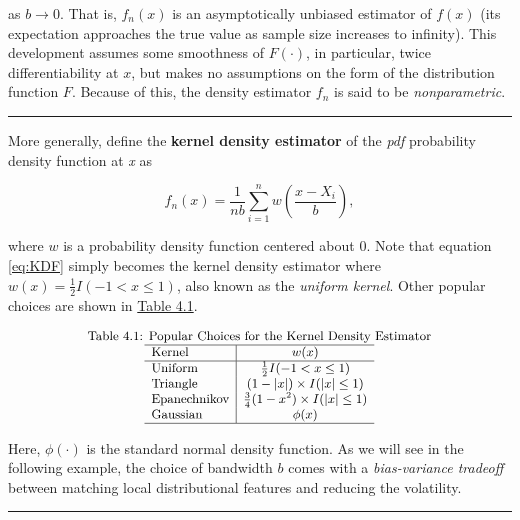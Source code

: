 \documentclass[]{book}
\theoremstyle{definition}
\theoremstyle{definition}
\theoremstyle{definition}
\theoremstyle{remark}
\begin{document}
as \(b\rightarrow 0\). That is, \(f_n(x)\) is an asymptotically unbiased
estimator of \(f(x)\) (its expectation approaches the true value as
sample size increases to infinity). This development assumes some
smoothness of \(F(\cdot)\), in particular, twice differentiability at
\(x\), but makes no assumptions on the form of the distribution function
\(F\). Because of this, the density estimator \(f_n\) is said to be
\emph{nonparametric}.

\begin{center}\rule{0.5\linewidth}{\linethickness}\end{center}

More generally, define the \textbf{kernel density estimator} of the
\emph{pdf}{ probability density function} at \emph{x} as

\begin{equation} 
  f_n(x) = \frac{1}{nb} \sum_{i=1}^n w\left(\frac{x-X_i}{b}\right) ,
  \label{eq:kernelDens}
\end{equation}

where \(w\) is a probability density function centered about 0. Note
that equation \eqref{eq:KDF} simply becomes the kernel density estimator
where \(w(x) = \frac{1}{2}I(-1 < x \le 1)\), also known as the
\emph{uniform kernel}. Other popular choices are shown in
\protect\hyperlink{tab:41}{Table 4.1}.

\[
{\small
\begin{matrix}
\text{Table 4.1: Popular Choices for the Kernel Density Estimator}\\
\begin{array}{l|cc}
\hline
\text{Kernel} &  w(x) \\
\hline 
\text{Uniform } &  \frac{1}{2}I(-1 < x \le 1) \\
\text{Triangle} &  (1-|x|)\times I(|x| \le 1) \\
\text{Epanechnikov} & \frac{3}{4}(1-x^2) \times I(|x| \le 1) \\
\text{Gaussian} & \phi(x) \\
\hline
\end{array}\end{matrix}
}
\]

Here, \(\phi(\cdot)\) is the standard normal density function. As we
will see in the following example, the choice of bandwidth \(b\) comes
with a \emph{bias-variance tradeoff} between matching local
distributional features and reducing the volatility.

\begin{center}\rule{0.5\linewidth}{\linethickness}\end{center}
\end{document}

